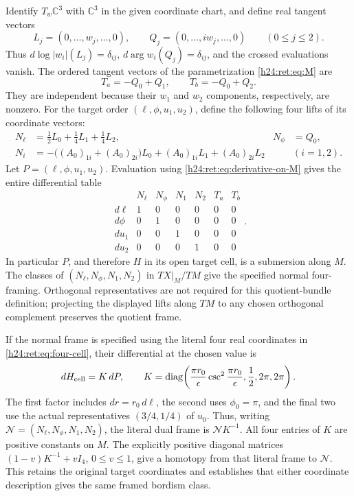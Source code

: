 Identify \(T_w\mathbb C^3\) with \(\mathbb C^3\) in the given coordinate chart,
and define real tangent vectors
\begin{equation}
 L_j=(0,\ldots,w_j,\ldots,0),\qquad
 Q_j=(0,\ldots,iw_j,\ldots,0)\qquad(0\leq j\leq2).
 \label{h24:ret:eq:LQ}
\end{equation}
Thus \(d\log|w_i|(L_j)=\delta_{ij}\),
\(d\arg w_i(Q_j)=\delta_{ij}\), and the crossed evaluations vanish.
The ordered tangent vectors of the parametrization \eqref{h24:ret:eq:M} are
\begin{equation}
 T_a=-Q_0+Q_1,\qquad T_b=-Q_0+Q_2.
 \label{h24:ret:eq:tangents}
\end{equation}
They are independent because their \(w_1\) and \(w_2\) components,
respectively, are nonzero.  For the target order
\((\ell,\phi,u_1,u_2)\), define the following four lifts of its
coordinate vectors:
\begin{align}
 N_\ell&=\tfrac12L_0+\tfrac14L_1+\tfrac14L_2,
       &N_\phi&=Q_0,\label{h24:ret:eq:normal-first}\\
 N_i&=-\bigl((A_0)_{1i}+(A_0)_{2i}\bigr)L_0
           +(A_0)_{1i}L_1+(A_0)_{2i}L_2
       &&(i=1,2).\label{h24:ret:eq:normal-u}
\end{align}
Let \(P=(\ell,\phi,u_1,u_2)\).  Evaluation using
\eqref{h24:ret:eq:derivative-on-M} gives the entire differential table
\begin{equation}
\begin{array}{c|rrrrrr}
 &N_\ell&N_\phi&N_1&N_2&T_a&T_b\\\hline
 d\ell&1&0&0&0&0&0\\
 d\phi&0&1&0&0&0&0\\
 du_1&0&0&1&0&0&0\\
 du_2&0&0&0&1&0&0
\end{array}.
 \label{h24:ret:eq:differential-table}
\end{equation}
In particular \(P\), and therefore \(H\) in its open target cell,
is a submersion along \(M\).  The classes of
\((N_\ell,N_\phi,N_1,N_2)\) in \(TX|_M/TM\) give the specified
normal four-framing.  Orthogonal representatives are not required for
this quotient-bundle definition; projecting the displayed lifts along
\(TM\) to any chosen orthogonal complement preserves the quotient
frame.

If the normal frame is specified using the literal four real coordinates
in \eqref{h24:ret:eq:four-cell}, their differential at the chosen value is
\[
 dH_{\rm cell}=K\,dP,\qquad
 K=\operatorname{diag}\!\left(
 \frac{\pi r_0}{\epsilon}\csc^2\frac{\pi r_0}{\epsilon},
 \frac12,2\pi,2\pi\right).
\]
The first factor includes \(dr=r_0\,d\ell\), the second uses
\(\phi_0=\pi\), and the final two use the actual representatives
\((3/4,1/4)\) of \(u_0\). Thus, writing
\(\mathcal N=(N_\ell,N_\phi,N_1,N_2)\), the literal dual frame is
\(\mathcal N K^{-1}\). All four entries of \(K\) are positive
constants on \(M\). The explicitly positive diagonal matrices
\((1-v)K^{-1}+vI_4\), \(0\leq v\leq1\), give a homotopy
from that literal frame to \(\mathcal N\). This retains the original
target coordinates and establishes that either coordinate description
gives the same framed bordism class.

